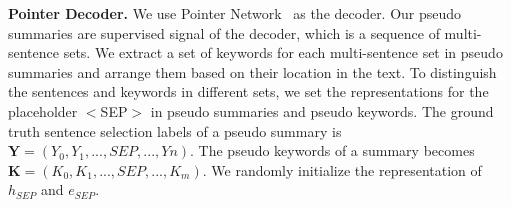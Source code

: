 \textbf{Pointer Decoder.} 
We use Pointer Network~\cite{PointNet15} as the decoder.
Our pseudo summaries are supervised signal of the decoder, which is a sequence of multi-sentence sets.
We extract a set of keywords for each multi-sentence set in pseudo summaries and arrange them
based on their location in the text.
To distinguish the sentences and keywords in different sets, 
we set the representations for the
placeholder $<$SEP$>$ in pseudo summaries and pseudo keywords.%
The ground truth sentence selection labels of a pseudo summary is
$\textbf{Y} = (Y_0,Y_1,...,SEP,...,Yn)$.
The pseudo keywords of a summary becomes $\textbf{K} = (K_0,K_1,...,SEP,...,K_m)$.
We randomly initialize the representation of $h_{SEP}$ and $e_{SEP}$. 

